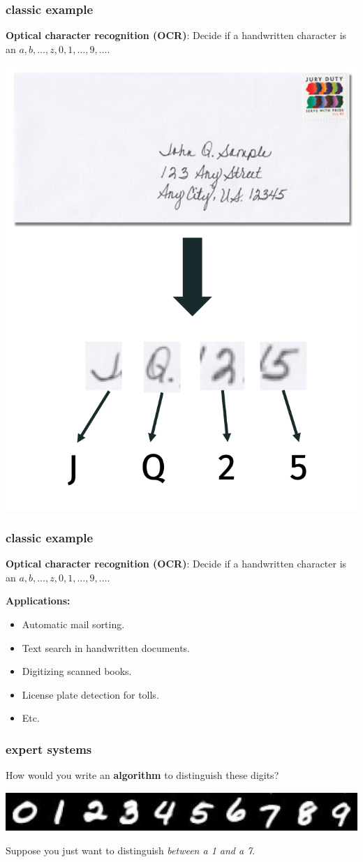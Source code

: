 \documentclass[handout,compress]{beamer}
\begin{document}
\begin{frame}
	\frametitle{classic example}
	\textbf{Optical character recognition (OCR)}: Decide if a handwritten character is an $a,b,\ldots, z, 0,1, \ldots, 9, \ldots$.
	\begin{center}
		\includegraphics[width=.5\textwidth]{ocrPipeline.png}
	\end{center}
\end{frame}

\begin{frame}
	\frametitle{classic example}
	\textbf{Optical character recognition (OCR)}: Decide if a handwritten character is an $a,b,\ldots, z, 0,1, \ldots, 9, \ldots$.
	
	\textbf{Applications:}
	\begin{itemize}
		\item Automatic mail sorting.
		\item Text search in handwritten documents.
		\item Digitizing scanned books.
		\item License plate detection for tolls.
		\item Etc.
	\end{itemize}
\end{frame}

\begin{frame}[t]
	\frametitle{expert systems}
	How would you write an \textbf{algorithm} to distinguish these digits?
	\begin{center}
		\includegraphics[width=.6\textwidth]{all_digits.png}
	\end{center}
	Suppose you just want to distinguish \emph{between a 1 and a 7}. 
\end{frame}
\end{document}
